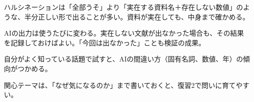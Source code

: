 \begin{point}
  \item ハルシネーションは「全部うそ」より「実在する資料名＋存在しない数値」のような、半分正しい形で出ることが多い。資料が実在しても、中身まで確かめる。
  \item AIの出力は使うたびに変わる。実在しない文献が出なかった場合も、その結果を記録しておけばよい。「今回は出なかった」ことも検証の成果。
  \item 自分がよく知っている話題で試すと、AIの間違い方（固有名詞、数値、年）の傾向がつかめる。
  \item 関心テーマは、「なぜ気になるのか」まで書いておくと、復習2で問いに育てやすい。
\end{point}

